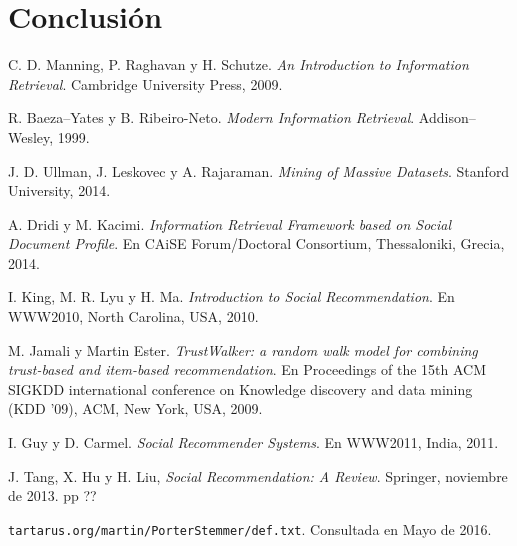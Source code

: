 \documentclass[11pt, spanish]{report}
\begin{document}
	\chapter{Conclusión}
		
	
		
	\begin{thebibliography}{56}
		
  			C. D. Manning, P. Raghavan y H. Schutze.
  			\textit{An Introduction to Information Retrieval}.
  			Cambridge University Press, 
  			2009.
  		
  			R. Baeza--Yates y B. Ribeiro-Neto.
  			\textit{Modern Information Retrieval}.
  			Addison--Wesley, 
  			1999.
  		
  			J. D. Ullman, J. Leskovec y A. Rajaraman.
  			\textit{Mining of Massive Datasets}.
  			Stanford University, 
  			2014.
  			
  			A. Dridi y M. Kacimi. 
  			\textit{Information Retrieval Framework based on Social Document Profile}. 
  			En CAiSE Forum/Doctoral Consortium, Thessaloniki, Grecia, 2014.
  		
  			I. King, M. R. Lyu y H. Ma. 
  			\textit{Introduction to Social Recommendation}. 
  			En WWW2010, North Carolina, USA, 2010.

  			M. Jamali y Martin Ester. 
  			\textit{TrustWalker: a random walk model for combining trust-based and item-based recommendation}. 
  			En Proceedings of the 15th ACM SIGKDD international conference on Knowledge discovery and data mining (KDD '09), ACM, New York, USA, 2009.
  			
  			I. Guy y D. Carmel. 
  			\textit{Social Recommender Systems}. 
  			En WWW2011, India, 2011.
  		
  			J. Tang, X. Hu y H. Liu, 
  			\textit{Social Recommendation: A Review}. 
  			Springer, 
  			noviembre de 2013. 
  			pp ??
  		
  			\texttt{tartarus.org/martin/PorterStemmer/def.txt}.
  			Consultada en Mayo de 2016.
  			
	\end{thebibliography}
		
	\appendix
\end{document}
